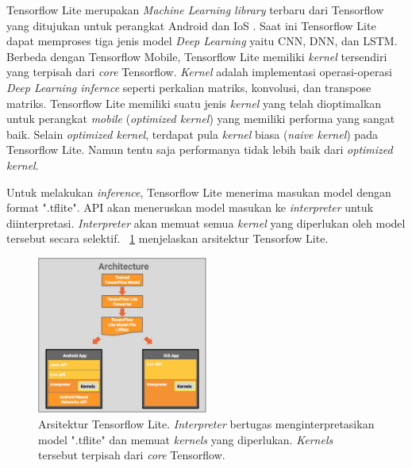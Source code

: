 Tensorflow Lite merupakan \textit{Machine Learning library} terbaru dari Tensorflow yang ditujukan untuk perangkat Android dan IoS \cite{tflite}. Saat ini Tensorflow Lite dapat memproses tiga jenis model \textit{Deep Learning} yaitu CNN, DNN, dan LSTM. Berbeda dengan Tensorflow Mobile, Tensorflow Lite memiliki \textit{kernel} tersendiri yang terpisah dari \textit{core} Tensorflow. \textit{Kernel} adalah implementasi operasi-operasi \textit{Deep Learning infernce} seperti perkalian matriks, konvolusi, dan transpose matriks. Tensorflow Lite memiliki suatu jenis \textit{kernel} yang telah dioptimalkan untuk perangkat \textit{mobile} (\textit{optimized kernel}) yang memiliki performa yang sangat baik. Selain \textit{optimized kernel}, terdapat pula \textit{kernel} biasa (\textit{naive kernel}) pada Tensorflow Lite. Namun tentu saja performanya tidak lebih baik dari \textit{optimized kernel}.

Untuk melakukan \textit{inference}, Tensorflow Lite menerima masukan model dengan format ".tflite". API akan meneruskan model masukan ke \textit{interpreter} untuk diinterpretasi. \textit{Interpreter} akan memuat semua \textit{kernel} yang diperlukan oleh model tersebut secara selektif. \pic~\ref{fig:tflite} menjelaskan arsitektur Tensorfow Lite.

\begin{figure}
	\centering
	\includegraphics[width=0.50\textwidth]
	{pics/tflite.jpg}
	\caption{Arsitektur Tensorflow Lite. \textit{Interpreter} bertugas menginterpretasikan model ".tflite" dan memuat \textit{kernels} yang diperlukan. \textit{Kernels} tersebut terpisah dari \textit{core} Tensorflow.}
	\label{fig:tflite}
\end{figure}

